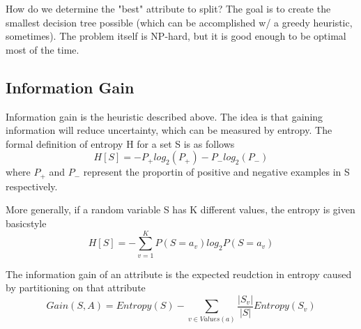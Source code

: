 How do we determine the "best" attribute to split? The goal is to create the smallest decision tree possible (which can be accomplished w/ a greedy heuristic, sometimes). The problem itself is NP-hard, but it is good enough to be optimal most of the time. 

\subsection*{Information Gain}
Information gain is the heuristic described above. The idea is that gaining information will reduce uncertainty, which can be measured by entropy. The formal definition of entropy H for a set S is as follows
\[
    H[S]   = -P_+log_2(P_+) - P_-log_2(P_-)
\]
where $P_+$ and $P_-$ represent the proportin of positive and negative examples in S respectively.

More generally, if a random variable S has K different values, the entropy is given basicstyle
\[
    H[S] = - \sum_{v=1}^{K}P(S=a_v)log_2P(S=a_v)
\]

The information gain of an attribute is the expected reudction in entropy caused by partitioning on that attribute
\[
    Gain(S,A) = Entropy(S) - \sum_{v \in Values(a)}\frac{|S_v|}{|S|}Entropy(S_v)
\]